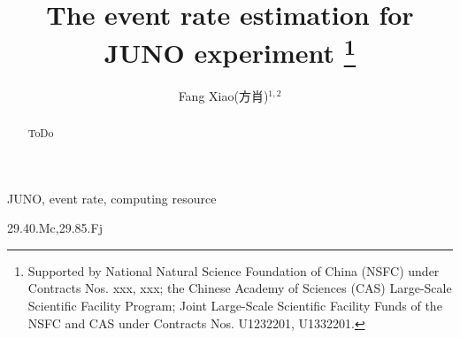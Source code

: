 \documentclass[a4paper,10pt,twoside]{paper}
\begin{document}
	 

	\title{The event rate estimation for JUNO experiment \thanks{Supported by National Natural Science Foundation of China (NSFC) under Contracts Nos. xxx, xxx; the Chinese Academy of Sciences (CAS) Large-Scale Scientific Facility Program; Joint Large-Scale Scientific Facility Funds of the NSFC and CAS under Contracts Nos.  U1232201, U1332201.} }


	\author{Fang Xiao(方肖)$^{1,2}$
	}
	\maketitle

	\address{
		$^1$ School of Physics, Sichuan University, Chengdu 610065 , China\\
		$^2$ Institute of High Energy Physics, Chinese Academy of Sciences, Beijing 100049, China\\
	}

	\begin{abstract}
		ToDo

	\end{abstract}


	\begin{keyword}
		JUNO,  event rate, computing resource
	\end{keyword}

	\begin{pacs}
		29.40.Mc,29.85.Fj
	\end{pacs}

\end{document}
